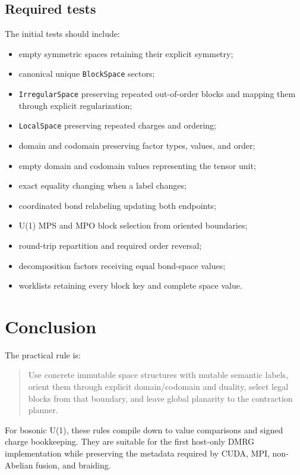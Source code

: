 \documentclass[11pt]{article}
\begin{document}
\subsection{Required tests}

The initial tests should include:

\begin{itemize}
  \item empty symmetric spaces retaining their explicit symmetry;
  \item canonical unique \texttt{BlockSpace} sectors;
  \item \texttt{IrregularSpace} preserving repeated out-of-order
        blocks and mapping them through explicit regularization;
  \item \texttt{LocalSpace} preserving repeated charges and ordering;
  \item domain and codomain preserving factor types, values, and order;
  \item empty domain and codomain values representing the tensor unit;
  \item exact equality changing when a label changes;
  \item coordinated bond relabeling updating both endpoints;
  \item U(1) MPS and MPO block selection from oriented boundaries;
  \item round-trip repartition and required order reversal;
  \item decomposition factors receiving equal bond-space values;
  \item worklists retaining every block key and complete space value.
\end{itemize}

\section{Conclusion}

The practical rule is:

\begin{quote}
Use concrete immutable space structures with mutable semantic labels,
orient them through explicit domain/codomain and duality, select legal
blocks from that boundary, and leave global planarity to the
contraction planner.
\end{quote}

For bosonic U(1), these rules compile down to value comparisons and
signed charge bookkeeping.  They are suitable for the first host-only
DMRG implementation while preserving the metadata required by CUDA,
MPI, non-Abelian fusion, and braiding.
\end{document}
